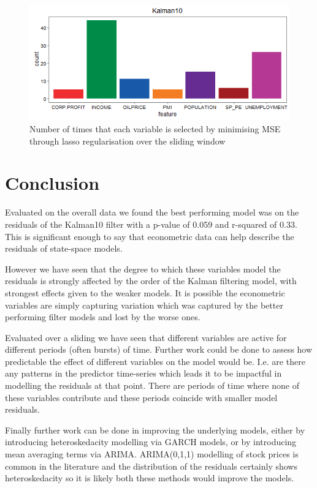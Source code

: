\documentclass{sig-alternate-05-2015}
\begin{document}
\begin{figure}[b]
	\includegraphics[width=\linewidth]{count_Kalman10.png}
	\centering
	\caption{Number of times that each variable is selected by minimising MSE through lasso regularisation over the sliding window}
			\label{fig:counts}
\end{figure}






\section{Conclusion}
Evaluated on the overall data we found the best performing model was on the residuals of the Kalman10 filter with a p-value of 0.059 and r-squared of 0.33. This is significant enough to say that econometric data can help describe the residuals of state-space models.

However we have seen that the degree to which these variables model the residuals is strongly affected by the order of the Kalman filtering model, with strongest effects given to the weaker models. It is possible the econometric variables are simply capturing variation which was captured by the better performing filter models and lost by the worse ones.  

Evaluated over a sliding we have seen that different variables are active for different periods (often bursts) of time. Further work could be done to assess how predictable the effect of different variables on the model would be. I.e. are there any patterns in the predictor time-series which leads it to be impactful in modelling the residuals at that point. There are periods of time where none of these variables contribute and these periods coincide with smaller model residuals. 
 
Finally further work can be done in improving the underlying models, either by introducing heteroskedacity modelling via GARCH models, or by introducing mean averaging terms via ARIMA. ARIMA(0,1,1) modelling of stock prices is common in the literature and the distribution of the residuals certainly shows heteroskedacity so it is likely both these methods would improve the models. 
 
\end{document}
